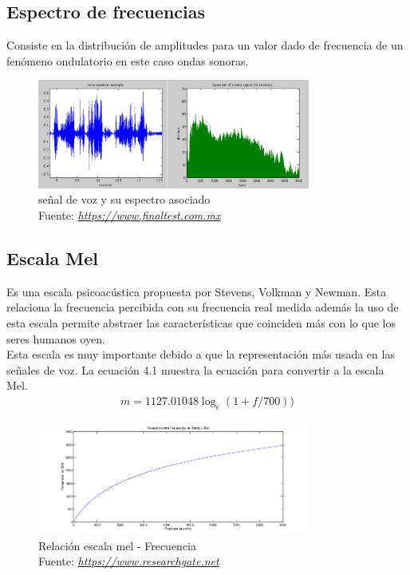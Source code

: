 \subsection{Espectro de frecuencias}
Consiste en la distribución de amplitudes para un valor dado de frecuencia de un fenómeno ondulatorio en este caso ondas sonoras.
\begin{figure}[H]
	\centering
	\includegraphics[width=0.8\textwidth]{Figures/espectro.png}
	\caption{señal de voz y su espectro asociado\\ Fuente:  \href{https://www.finaltest.com.mx/product-p/art-03.htm}{\textit{https://www.finaltest.com.mx}}}
	\label{señal}
\end{figure} 

\subsection{Escala Mel}
Es una escala psicoacústica propuesta por Stevens, Volkman y Newman. Esta relaciona la frecuencia percibida con su frecuencia real medida además la uso de esta escala permite abstraer las características que coinciden más con lo que los seres humanos oyen.\\ 
Esta escala es muy importante debido a que la representación más usada en las señales de voz.
La ecuación 4.1 muestra la ecuación para convertir a la escala Mel.
\begin{equation}
\label{STg}
\begin{aligned}
m=1127.01048\log_{e}(1+f/700))
\end{aligned}
\end{equation}


\begin{figure}[H]
	\centering
	\includegraphics[width=0.8\textwidth]{Figures/escala_mel.png}
	\caption{Relación escala mel - Frecuencia\\ Fuente:  \href{https://www.researchgate.net/figure/Relacion-entre-frecuencia-en-Hz-eje-x-y-en-escala-Mel-eje-y_fig2_312041038}{\textit{https://www.researchgate.net}}}
	\label{mel}
\end{figure} 

